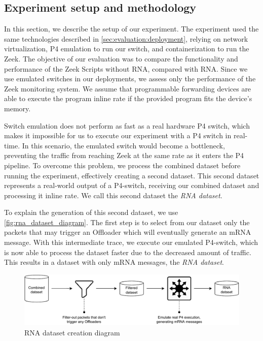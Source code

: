


\subsection{Experiment setup and methodology}
\label{sec:evaluation:setup}

In this section, we describe the setup of our experiment. The experiment used the same technologies described in \autoref{sec:evaluation:deployment}, relying on network virtualization, P4 emulation to run our switch, and containerization to run the Zeek. The objective of our evaluation was to compare the functionality and performance of the Zeek Scripts without RNA, compared with RNA. Since we use emulated switches in our deployments, we assess only the performance of the Zeek monitoring system. We assume that programmable forwarding devices are able to execute the program inline rate if the provided program fits the device's memory.

Switch emulation does not perform as fast as a real hardware P4 switch, which makes it impossible for us to execute our experiment with a P4 switch in real-time. In this scenario, the emulated switch would become a bottleneck, preventing the traffic from reaching Zeek at the same rate as it enters the P4 pipeline. To overcome this problem, we process the combined dataset before running the experiment, effectively creating a second dataset. This second dataset represents a real-world output of a P4-switch, receiving our combined dataset and processing it inline rate. We call this second dataset the \textit{RNA dataset}.

To explain the generation of this second dataset, we use \autoref{fig:rna_dataset_diagram}. The first step is to select from our dataset only the packets that may trigger an Offloader which will eventually generate an mRNA message. With this intermediate trace, we execute our emulated P4-switch, which is now able to process the dataset faster due to the decreased amount of traffic. This results in a dataset with only mRNA messages, the \textit{RNA dataset}.

\begin{figure}[htb]
    \caption{RNA dataset creation diagram}
    \begin{center}
        \includegraphics[width=1.0\textwidth]{images/rna_dataset_creation.pdf}  
    \end{center}
    \label{fig:rna_dataset_diagram}
\end{figure}


